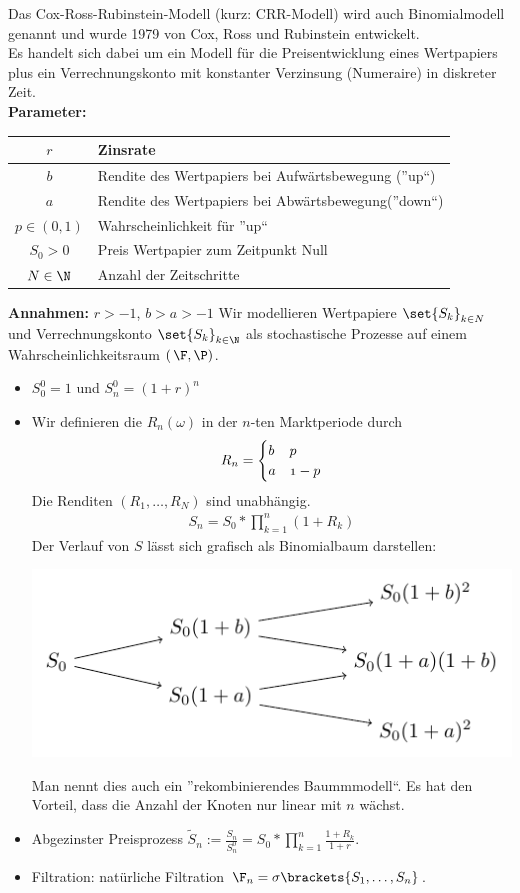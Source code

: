 ﻿Das Cox-Ross-Rubinstein-Modell (kurz: CRR-Modell) wird auch Binomialmodell genannt und wurde 1979 von Cox, Ross und Rubinstein entwickelt.\\
Es handelt sich dabei um ein Modell für die Preisentwicklung eines Wertpapiers plus ein Verrechnungskonto mit konstanter Verzinsung (Numeraire) in diskreter Zeit.\\
\textbf{Parameter:}

\begin{center}
	\begin{tabular}{|c|l|}
		\hline
		$r$ & Zinsrate \\ \hline
		$b$ & Rendite des Wertpapiers bei Aufwärtsbewegung (''up``) \\ \hline
		$a$ & Rendite des Wertpapiers bei Abwärtsbewegung(''down``) \\ \hline
		$p \in (0,1)$ & Wahrscheinlichkeit für ''up`` \\ \hline
		$S_0 > 0$ & Preis Wertpapier zum Zeitpunkt Null \\ \hline
		$N \in \N$ & Anzahl der Zeitschritte \\ \hline
	\end{tabular}
\end{center}
\textbf{Annahmen:} $r > -1$, $b > a > -1$
Wir modellieren Wertpapiere $\set{S_k}_{k \in N}$ und Verrechnungskonto $\set{S_k}_{k \in \N}$ als stochastische Prozesse auf einem Wahrscheinlichkeitsraum $(\, \F, \P)$.

\begin{itemize}
	\item $S_0^0 = 1$ und $S_n^0 = (1+r)^n$
	\item Wir definieren die  $R_n(\omega)$ in der $n$-ten Marktperiode durch
	\begin{align*}
	R_n = \begin{cases} b & \mit p \\ a & \mit 1-p \end{cases}
	\end{align*}
	Die Renditen $(R_1, \dots, R_N)$ sind unabhängig.
	\begin{align*}
	S_n = S_0 * \prod_{k=1}^n (1+R_k)
	\end{align*}
	Der Verlauf von $S$ lässt sich grafisch als Binomialbaum darstellen:
	\begin{center}
		\includegraphics[width=.5\textwidth]{tikz/stochv_1_2_crr.pdf}
	\end{center}
	Man nennt dies auch ein ''rekombinierendes Baummmodell``. Es hat den Vorteil, dass die Anzahl der Knoten nur linear mit $n$ wächst.
	\item Abgezinster Preisprozess $\tilde{S}_n := \frac{S_n}{S_n^0} = S_0 * \prod_{k=1}^n \frac{1+R_k}{1+r}$.
	\item Filtration: natürliche Filtration $\F_n = \sigma \brackets{S_1, \dots, S_n}$.
\end{itemize}


